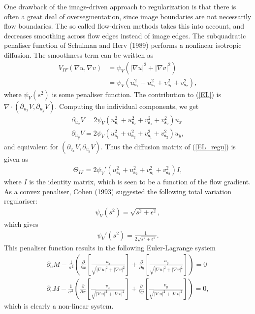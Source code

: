 One drawback of the image-driven approach to regularization is that there is often a great deal of oversegmentation, since image boundaries are not necessarily flow boundaries. The so called flow-driven methods takes this into account, and decreases smoothing across flow edges instead of image edges. The subquadratic penaliser function of Schulman and Herv (1989) performs a nonlinear isotropic diffusion. The smoothness term can be written as
\begin{align*}
V_{IF}(\nabla u, \nabla v) &= \psi_V \left( |\nabla u|^2 + |\nabla v|^2 \right) \\ 
&= \psi_V \left( u_{\textbf{s}_1}^2 + u_{\textbf{s}_2}^2 + v_{\textbf{s}_1}^2 + v_{\textbf{s}_2}^2 \right),
\end{align*} 
where $\psi_V(s^2)$ is some penaliser function. The contribution to (\ref{EL}) is $\nabla \cdot (\partial_{u_x} V, \partial_{u_y} V)$. Computing the individual components, we get
\begin{align*}
\partial_{u_x} V = 2 \psi_V \left( u_{\textbf{s}_1}^2 + u_{\textbf{s}_2}^2 + v_{\textbf{s}_1}^2 + v_{\textbf{s}_2}^2 \right) u_x \\
\partial_{u_y} V = 2 \psi_V \left( u_{\textbf{s}_1}^2 + u_{\textbf{s}_2}^2 + v_{\textbf{s}_1}^2 + v_{\textbf{s}_2}^2 \right) u_y,
\end{align*}
and equivalent for $(\partial_{v_x} V, \partial_{v_y} V)$. Thus the diffusion matrix of (\ref{EL_regu}) is given as
\begin{align*}
\Theta_{IF} = 2 \psi_V'\left( u_{\textbf{s}_1}^2 + u_{\textbf{s}_2}^2 + v_{\textbf{s}_1}^2 + v_{\textbf{s}_2}^2 \right) I,
\end{align*}
where $I$ is the identity matrix, which is seen to be a function of the flow gradient. As a convex penaliser, Cohen (1993) suggested the following total variation regulariser:
\begin{align*}
\psi_V(s^2) = \sqrt{s^2 + \epsilon^2},
\end{align*} 
which gives
\begin{align*}
\psi_V'(s^2) = \frac{1}{2 \sqrt{s^2 + \epsilon^2}}.
\end{align*}
This penaliser function results in the following Euler-Lagrange system
\begin{equation}
\begin{aligned}
\label{EL_LD}
\partial_u M - \frac{1}{\sigma^2} \left(\frac{\partial}{\partial x}\left[ \frac{u_x}{\sqrt{|\nabla u|^2 + |\nabla v|^2}} \right] + \frac{\partial}{\partial y} \left[ \frac{u_y}{\sqrt{|\nabla u|^2 + |\nabla v|^2}} \right] \right) = 0 \\
\partial_v M - \frac{1}{\sigma^2} \left(\frac{\partial}{\partial x}\left[ \frac{v_x}{\sqrt{|\nabla u|^2 + |\nabla v|^2}} \right] + \frac{\partial}{\partial y} \left[ \frac{v_y}{\sqrt{|\nabla u|^2 + |\nabla v|^2}} \right] \right) = 0,
\end{aligned}
\end{equation}
which is clearly a non-linear system. \cite{LaggedDiff}



